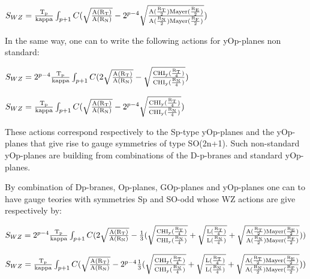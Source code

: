 \documentclass[a4paper,a4paper]{article}
\begin{document}
\begin{center}
{  $ S_{WZ} = \frac{\rm T_p}{\rm kappa}\int_{p+1} C(\sqrt{\frac{\rm A(R_T)}{\rm A(R_N)}}-2^{p-4}\sqrt{\frac{\rm A(\frac{\rm R_T}{\rm 2})Mayer(\frac{\rm R_E}{\rm 2})}{\rm A(\frac{\rm R_N}{\rm 2})Mayer(\frac{\rm R_F}{\rm 2})}})$ }
\end{center}
In the same way, one can to write the following actions for yOp-planes non standard:
\begin{center}
{  $ S_{WZ} = 2^{p-4}\frac{\rm T_p}{\rm kappa}\int_{p+1} C(2\sqrt{\frac{\rm A(R_T)}{\rm A(R_N)}}-\sqrt{\frac{\rm CHI_y(\frac{\rm R_T}{\rm 4}) }{\rm CHI_y(\frac{\rm R_N}{\rm 4})}})$ }
\end{center}
\begin{center}
{  $ S_{WZ} = \frac{\rm T_p}{\rm kappa}\int_{p+1} C(\sqrt{\frac{\rm A(R_T)}{\rm A(R_N)}}-2^{p-4}\sqrt{\frac{\rm CHI_y(\frac{\rm R_T}{\rm 4} )}{\rm CHI_y(\frac{\rm R_N}{\rm 4})}})$ }
\end{center}
These actions correspond respectively to the Sp-type yOp-planes and the yOp-planes that give rise to gauge symmetries of type SO(2n+1).  Such non-standard yOp-planes are building from combinations of the D-p-branes and standard yOp-planes.



By combination of Dp-branes, Op-planes, GOp-planes  and yOp-planes one can to have gauge teories with symmetries Sp and SO-odd whose WZ actions are give respectively by:
\begin{center}
{  $ S_{WZ} = 2^{p-4}\frac{\rm T_p}{\rm kappa}\int_{p+1} C(2\sqrt{\frac{\rm A(R_T)}{\rm A(R_N)}}-\frac{\rm 1}{\rm 3}(\sqrt{\frac{\rm CHI_y(\frac{\rm R_T}{\rm 4}) }{\rm CHI_y(\frac{\rm R_N}{\rm 4})}}+\sqrt{\frac{\rm L(\frac{\rm R_T}{\rm 4}) }{\rm L(\frac{\rm R_N}{\rm 4})}}+\sqrt{\frac{\rm A(\frac{\rm R_T}{\rm 2})Mayer(\frac{\rm R_E}{\rm 2})}{\rm A(\frac{\rm R_N}{\rm 2})Mayer(\frac{\rm R_F}{\rm 2})}}))$ }
\end{center}
\begin{center}
{  $ S_{WZ} = \frac{\rm T_p}{\rm kappa}\int_{p+1} C(\sqrt{\frac{\rm A(R_T)}{\rm A(R_N)}}-2^{p-4}\frac{\rm 1}{\rm 3}(\sqrt{\frac{\rm CHI_y(\frac{\rm R_T}{\rm 4} )}{\rm CHI_y(\frac{\rm R_N}{\rm 4})}}+\sqrt{\frac{\rm L(\frac{\rm R_T}{\rm 4}) }{\rm L(\frac{\rm R_N}{\rm 4})}}+\sqrt{\frac{\rm A(\frac{\rm R_T}{\rm 2})Mayer(\frac{\rm R_E}{\rm 2})}{\rm A(\frac{\rm R_N}{\rm 2})Mayer(\frac{\rm R_F}{\rm 2})}}))$ }
\end{center}
\end{document}
